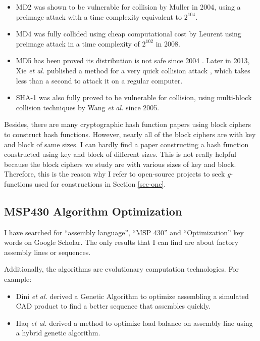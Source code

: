 \documentclass[sigconf, review=false]{acmart}
\let\OldTexttrademark\texttrademark
\renewcommand{\texttrademark}{\OldTexttrademark\xspace}%
\begin{document}
\begin{itemize}
    \item MD2 was shown to be vulnerable for collision by Muller in 2004,
          using a preimage attack with a time complexity equivalent to $2^{104}$. \cite{muller2004md2}
    \item MD4 was fully collided using cheap computational cost by Leurent
          using preimage attack in a time complexity of $2^{102}$ in 2008. \cite{leurent2008md4}
    \item MD5 has been proved its distribution is not safe since 2004 \cite{hawkes2004musings}.
          Later in 2013, Xie \textit{et al.} published a method for a very quick collision attack \cite{xie2013fast},
          which takes less than a second to attack it on a regular computer.
    \item SHA-1 was also fully proved to be vulnerable for collision, using multi-block collision techniques
          by Wang \textit{et al.} since 2005. \cite{wang2005finding}
\end{itemize}

Besides, there are many cryptographic hash function papers using block ciphers to construct hash functions.
However, nearly all of the block ciphers are with key and block of same sizes.
I can hardly find a paper constructing a hash function constructed using key and block of different sizes.
This is not really helpful because the block ciphers we study are with various sizes of key and block.
Therefore, this is the reason why I refer to open-source projects to seek \textit{g}-functions used for constructions
in Section \ref{sec-one}.

\subsection{MSP430 Algorithm Optimization}
I have searched for ``assembly language'', ``MSP 430'' and ``Optimization'' key words on Google\texttrademark Scholar.
The only results that I can find are about factory assembly lines or sequences.

Additionally, the algorithms are evolutionary computation technologies. For example:

\begin{itemize}
    \item Dini \textit{et al.} derived a Genetic Algorithm to optimize assembling a simulated CAD product
          to find a better sequence that assembles quickly. \cite{dini1999generation}
    \item Haq \textit{et al.} derived a method to optimize load balance on assembly line
          using a hybrid genetic algorithm. \cite{haq2006hybrid}
\end{itemize}
\end{document}
